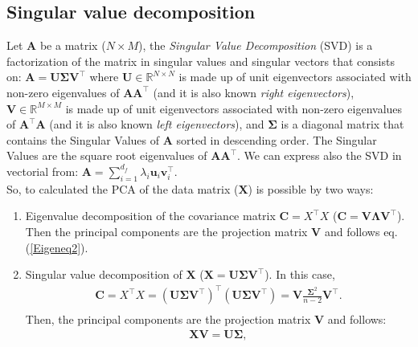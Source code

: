 \documentclass{article}
\def\X{{\mathbf X}}
\def\C{{\mathbf C}}
\def\A{{\mathbf A}}
\def\U{{\mathbf U}}
\def\V{{\mathbf V}}
\def\v{{\mathbf v}}
\def\u{{\mathbf u}}
\begin{document}
\subsection{ Singular value decomposition}
Let $\A$ be a matrix ($N \times M$), the {\em Singular Value Decomposition} (SVD) is a factorization of the matrix in singular values and singular vectors that consists on: $\A=\U\boldsymbol{\Sigma} \V^{\top}$ where $\U \in \mathbb{R}^{N \times N}$ is made up of unit eigenvectors associated with non-zero eigenvalues of $\A\A^{\top}$ (and it is also known {\em right eigenvectors}), $\V \in \mathbb{R}^{M \times M}$ is made up of unit eigenvectors associated with non-zero eigenvalues of $\A^{\top}\A$ (and it is also known {\em left eigenvectors}), and $\boldsymbol{\Sigma}$ is a diagonal matrix that contains the Singular Values of $\A$ sorted in descending order. The Singular Values are the square root eigenvalues of $\A\A^{\top}$. We can express also the SVD in vectorial from: $\A=\sum_{i=1}^{d_f} \lambda_i \u_i \v_i^{\top}$.\\

So, to calculated the PCA of the data matrix ($\X$) is possible by two ways:

\begin{enumerate}
\item Eigenvalue decomposition of the covariance matrix $\C= X^{\top}X$ ($\C = \V\boldsymbol{\Lambda} \V^{\top}$). Then the principal components are the projection matrix $\V$ and follows eq.(\ref{Eigeneq2}).

\item Singular value decomposition of $\X$ ($\X=\U\boldsymbol{\Sigma}\V^{\top}$). In this case, 
\begin{equation}
 \begin{split}
\label{svd} \C= X^{\top}X = (\U\boldsymbol{\Sigma}\V^{\top})^{\top}(\U\boldsymbol{\Sigma}\V^{\top}) = \V \frac{\boldsymbol{\Sigma}^2}{n-2} \V^{\top}.\\
 \end{split}
\end{equation}
Then, the principal components are the projection matrix $\V$ and follows: 
\begin{equation}
 \begin{split}
\label{svd2} 
\X\V=\U\boldsymbol{\Sigma}, 
 \end{split}
\end{equation}
\end{enumerate}
\end{document}
